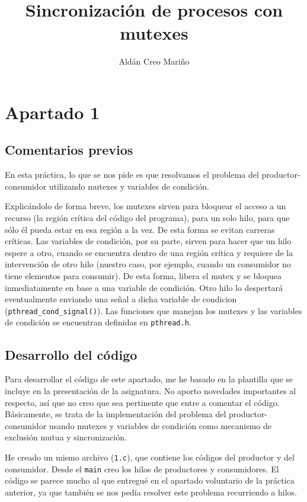 \documentclass[a4paper]{article}
\title{Sincronización de procesos con mutexes}
\author{Aldán Creo Mariño}
\begin{document}
\maketitle

\section{Apartado 1} \label{apartado_1}

\subsection{Comentarios previos}

En esta práctica, lo que se nos pide es que resolvamos el problema del productor-consumidor utilizando mutexes y variables de condición.

Explicándolo de forma breve, los mutexes sirven para bloquear el acceso a un recurso (la región crítica del código del programa), para un solo hilo, para que sólo él pueda estar en esa región a la vez. De esta forma se evitan carreras críticas. Las variables de condición, por su parte, sirven para hacer que un hilo espere a otro, cuando se encuentra dentro de una región crítica y requiere de la intervención de otro hilo (nuestro caso, por ejemplo, cuando un consumidor no tiene elementos para consumir). De esta forma, libera el mutex y se bloquea inmediatamente en base a una variable de condición. Otro hilo lo despertará eventualmente enviando una señal a dicha variable de condicion (\texttt{pthread\_cond\_signal()}). Las funciones que manejan los mutexes y las variables de condición se encuentran definidas en \texttt{pthread.h}.

\subsection{Desarrollo del código}

Para desarrollar el código de este apartado, me he basado en la plantilla que se incluye en la presentación de la asignatura. No aporto novedades importantes al respecto, así que no creo que sea pertinente que entre a comentar el código. Básicamente, se trata de la implementación del problema del productor-consumidor usando mutexes y variables de condición como mecanismo de exclusión mutua y sincronización.

He creado un mismo archivo (\texttt{1.c}), que contiene los códigos del productor y del consumidor. Desde el \texttt{main} creo los hilos de productores y consumidores. El código se parece mucho al que entregué en el apartado voluntario de la práctica anterior, ya que también se nos pedía resolver este problema recurriendo a hilos.
\end{document}
